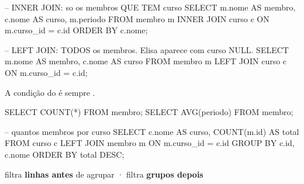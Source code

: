\begin{frame}[fragile]{}
  \vspace{0.3em}
  \begin{sql}
-- INNER JOIN: so os membros QUE TEM curso
SELECT m.nome AS membro, c.nome AS curso, m.periodo
FROM   membro m
INNER  JOIN curso c ON m.curso_id = c.id
ORDER  BY c.nome;
  \end{sql}

  \begin{sql}
-- LEFT JOIN: TODOS os membros. Elisa aparece com curso NULL.
SELECT m.nome AS membro, c.nome AS curso
FROM   membro m
LEFT   JOIN curso c ON m.curso_id = c.id;
  \end{sql}

  \vspace{0.3em}
  \begin{center}
    {\small A condição do  é sempre .}
  \end{center}

\end{frame}

\begin{frame}[fragile]{}
  \vspace{0.8em}
  \begin{sql}
SELECT COUNT(*) FROM membro;
SELECT AVG(periodo) FROM membro;
  \end{sql}

  \begin{sql}
-- quantos membros por curso
SELECT c.nome AS curso, COUNT(m.id) AS total
FROM   curso c
LEFT   JOIN membro m ON m.curso_id = c.id
GROUP  BY c.id, c.nome
ORDER  BY total DESC;
  \end{sql}

  \vspace{0.5em}
  \begin{center}
    {\small {} filtra \textbf{linhas antes} de agrupar ·
     filtra \textbf{grupos depois}}
  \end{center}

\end{frame}

